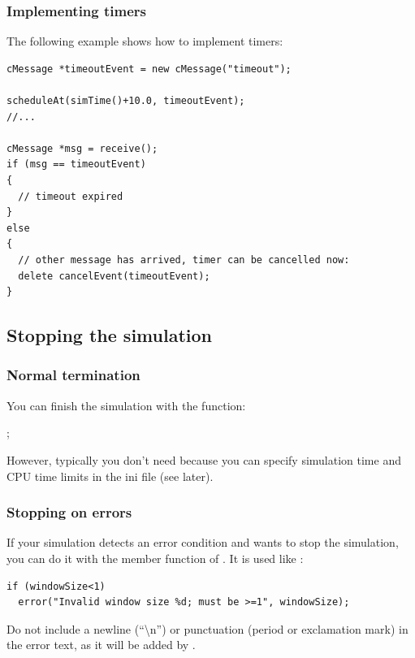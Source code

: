 \subsubsection{Implementing timers}

The following example shows how to implement timers:

\begin{verbatim}
cMessage *timeoutEvent = new cMessage("timeout");

scheduleAt(simTime()+10.0, timeoutEvent);
//...

cMessage *msg = receive();
if (msg == timeoutEvent)
{
  // timeout expired
}
else
{
  // other message has arrived, timer can be cancelled now:
  delete cancelEvent(timeoutEvent);
}
\end{verbatim}





\subsection{Stopping the simulation}

\subsubsection{Normal termination}


You can finish the simulation with the  function:


;


However, typically you don't need  because you
can specify simulation time and CPU time limits in the ini file (see later).


\subsubsection{Stopping on errors}


If your simulation detects an error condition and wants to stop
the simulation, you can do it with the  member function
of . It is used like :

\begin{verbatim}
if (windowSize<1)
  error("Invalid window size %d; must be >=1", windowSize);
\end{verbatim}


Do not include a newline (``{\textbackslash}n'') or punctuation (period
or exclamation mark) in the error text, as it will be added by {\opp}.





